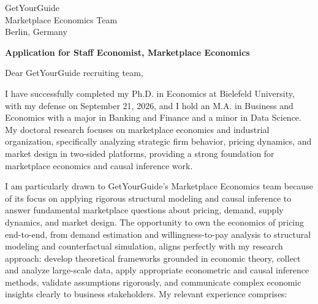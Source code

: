 \documentclass[11pt]{article}
\begin{document}
\vspace{0.1cm}

\vspace{0.1cm}

\noindent
GetYourGuide \\
Marketplace Economics Team \\
Berlin, Germany

\vspace{0.12cm}

\noindent
\textbf{Application for Staff Economist, Marketplace Economics}

\vspace{0.1cm}

\noindent Dear GetYourGuide recruiting team,

I have successfully completed my Ph.D. in Economics at Bielefeld University, with my defense on September 21, 2026, 
and I hold an M.A. in Business and Economics with a major in Banking and Finance and a minor in Data Science. 
My doctoral research focuses on marketplace economics and industrial organization, 
specifically analyzing strategic firm behavior, pricing dynamics, and market design in two-sided platforms, 
providing a strong foundation for marketplace economics and causal inference work.

I am particularly drawn to GetYourGuide's Marketplace Economics team because of its focus on applying rigorous structural modeling and causal inference to answer fundamental marketplace questions about pricing, demand, supply dynamics, and market design. 
The opportunity to own the economics of pricing end-to-end, from demand estimation and willingness-to-pay analysis to structural modeling and counterfactual simulation, aligns perfectly with my research approach: 
develop theoretical frameworks grounded in economic theory, collect and analyze large-scale data, apply appropriate econometric and causal inference methods, 
validate assumptions rigorously, and communicate complex economic insights clearly to business stakeholders.
My relevant experience comprises:
\end{document}
